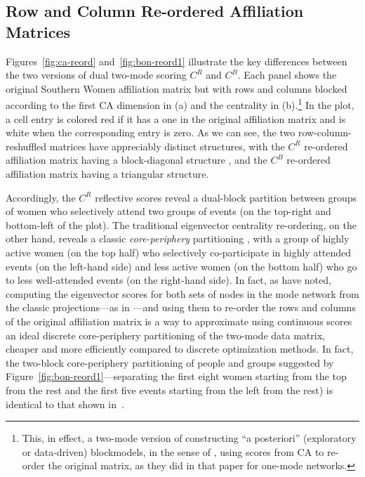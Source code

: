 \documentclass[a4paper,fleqn]{cas-sc}
\begin{document}
\subsection{Row and Column Re-ordered Affiliation Matrices} 
Figures~\ref{fig:ca-reord} and~\ref{fig:bon-reord1} illustrate the key differences between the two versions of dual two-mode scoring $C^R$ and $C^B$. Each panel shows the original Southern Women affiliation matrix but with rows and columns blocked according to the first CA dimension in (a) and the \citet{bonacich1991simultaneous} centrality in (b).\footnote{This, in effect, a two-mode version of constructing ``a posteriori'' (exploratory or data-driven) blockmodels, in the sense of \citet{wasserman1987stochastic}, using scores from CA to re-order the original matrix, as they did in that paper for one-mode networks.} In the plot, a cell entry is colored red if it has a one in the original affiliation matrix and is white when the corresponding entry is zero. As we can see, the two row-column-reshuffled matrices have appreciably distinct structures, with the $C^R$ re-ordered affiliation matrix having a block-diagonal structure \citep[34]{wasserman1990correspondence}, and the $C^B$ re-ordered affiliation matrix having a triangular structure. 

Accordingly, the $C^R$ reflective scores reveal a dual-block partition between groups of women who selectively attend two groups of events (on the top-right and bottom-left of the plot). The traditional eigenvector centrality re-ordering, on the other hand, reveals a classic \textit{core-periphery} partitioning \citep{borgatti2000models}, with a group of highly active women (on the top half) who selectively co-participate in highly attended events (on the left-hand side) and less active women (on the bottom half) who go to less well-attended events (on the right-hand side). In fact, as \citet[p. 206]{everett2013dual} have noted, computing the eigenvector scores for both sets of nodes in the mode network from the classic \citet{breiger1974duality} projections---as in \citet{bonacich1991simultaneous}---and using them to re-order the rows and columns of the original affiliation matrix is a way to approximate using continuous scores an ideal discrete core-periphery partitioning of the two-mode data matrix, cheaper and more efficiently compared to discrete optimization methods. In fact, the two-block core-periphery partitioning of people and groups suggested by Figure~\ref{fig:bon-reord1}---separating the first eight women starting from the top from the rest and the first five events starting from the left from the rest) is identical to that shown in~\citet[206, Table 2]{everett2013dual}.
\end{document}

